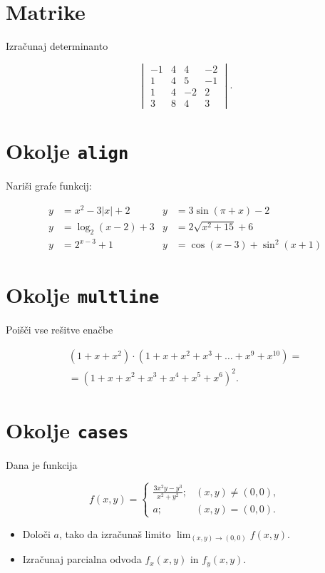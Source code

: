 \documentclass[a4paper,12pt]{article}
\begin{document}
\section*{Matrike}
Izračunaj determinanto

\[\begin{vmatrix}
   -1 & 4 & 4 & -2 \\
   1 & 4 & 5 & -1 \\
   1 & 4 & -2 & 2 \\
   3 & 8 & 4 & 3 
\end{vmatrix}.\]

\section*{Okolje \texttt{align}}
Nariši grafe funkcij:

\begin{align*}
   y&= x^2 - 3|x| + 2  &  y&= 3 \sin(\pi+x) - 2 \\
   y&= \log_2(x-2) + 3 &  y&= 2 \sqrt{x^2+15} + 6 \\
   y&= 2^{x-3} + 1     &  y&= \cos(x-3) + \sin^2(x+1)
\end{align*}

\section*{Okolje \texttt{multline}}
Poišči vse rešitve enačbe


\begin{multline*}
   (1+x+x^2) \cdot (1+x+x^2+x^3+\ldots+x^9+x^{10})= \\
   =(1+x+x^2+x^3+x^4+x^5+x^6)^2.
\end{multline*}


\section*{Okolje \texttt{cases}}
Dana je funkcija
   
\[ f(x,y) = 
\begin{cases}
   \frac{3x^2y-y^3}{x^2+y^2}; & (x,y) \ne (0,0), \\
   a; & (x,y) = (0,0).
\end{cases}\]

\begin{itemize}
\item Določi \(a\), tako da izračunaš limito \( \lim_{(x,y)\to(0,0)} f(x,y) \).
\item Izračunaj parcialna odvoda \(f_x(x,y)\) in \(f_y(x,y)\).
\end{itemize}
\end{document}
